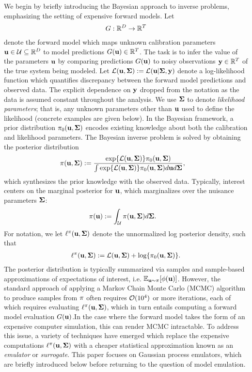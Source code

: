 \documentclass[12pt]{article}
\begin{document}
We begin by briefly introducing the Bayesian approach to inverse problems, emphasizing the setting of expensive forward models. 
Let 
\begin{align*}
G: \mathbb{R}^{D} \to \mathbb{R}^{T}
\end{align*}
denote the forward model which maps unknown calibration parameters $\mathbf{u} \in \mathcal{U} \subseteq \mathbb{R}^{D}$ to model predictions 
$G(\mathbf{u}) \in \mathbb{R}^{T}$. The task is to infer the value of the parameters $\mathbf{u}$ by comparing predictions $G(\mathbf{u})$ to noisy 
observations $\mathbf{y} \in \mathbb{R}^{T}$ of the true system being modeled. Let $\mathcal{L}(\mathbf{u}, \boldsymbol{\Sigma}) := \mathcal{L}(\mathbf{u} |\boldsymbol{\Sigma}, \mathbf{y})$ denote 
a log-likelihood function which quantifies discrepancy between the forward model predictions and observed data. The 
explicit dependence on $\mathbf{y}$ dropped from the notation as the data is assumed constant throughout the analysis. We use $\boldsymbol{\Sigma}$ to denote 
\textit{likelihood parameters}; that is, any unknown parameters other than $\mathbf{u}$ used to define the likelihood (concrete examples are given below). 
In the Bayesian framework, 
a prior distribution $\pi_0(\mathbf{u}, \boldsymbol{\Sigma})$ encodes existing knowledge about both the calibration and likelihood parameters. 
The Bayesian inverse problem is solved by obtaining the 
posterior distribution
\begin{align*}
\pi(\mathbf{u}, \boldsymbol{\Sigma}) &:= \frac{\exp\mathopen{}\left\{\mathcal{L}(\mathbf{u}, \boldsymbol{\Sigma})\right\}\mathclose{}\pi_0(\mathbf{u}, \boldsymbol{\Sigma})}{\int \exp\mathopen{}\left\{\mathcal{L}(\mathbf{u}, \boldsymbol{\Sigma})\right\}\mathclose{}\pi_0(\mathbf{u}, \boldsymbol{\Sigma}) d\mathbf{u} d\boldsymbol{\Sigma}},
\end{align*}
which synthesizes the prior knowledge with the observed data. Typically, interest centers on the marginal posterior for $\mathbf{u}$, which marginalizes over the nuisance 
parameters $\boldsymbol{\Sigma}$:
\begin{align*}
\pi(\mathbf{u}) &:= \int_{\mathcal{U}} \pi(\mathbf{u}, \boldsymbol{\Sigma}) d\boldsymbol{\Sigma}.
\end{align*}
For notation, we let $\ell^{\pi}(\mathbf{u}, \boldsymbol{\Sigma})$ denote the unnormalized log posterior density, such that 
\begin{align*}
\ell^{\pi}(\mathbf{u}, \boldsymbol{\Sigma}) := \mathcal{L}(\mathbf{u}, \boldsymbol{\Sigma}) + \log\mathopen{}\left\{\pi_0(\mathbf{u}, \boldsymbol{\Sigma})\right\}\mathclose{}.
\end{align*}
The posterior distribution is typically summarized via samples and sample-based approximations of expectations of interest, i.e. $\mathbb{E}_{\mathbf{u} \sim \pi}[\phi(\mathbf{u})]$.
However, the standard approach of applying a Markov Chain Monte Carlo (MCMC) algorithm to produce samples from $\pi$ often requires 
$\mathcal{O}(10^4)$ or more iterations, each of which requires evaluating $\ell^{\pi}(\mathbf{u}, \boldsymbol{\Sigma})$, which 
in turn entails computing a forward model evaluation $G(\mathbf{u})$.In the  case where the forward model takes the form of an expensive computer simulation, this 
can render MCMC intractable. To address this issue, a variety of techniques have emerged which replace the expensive computations 
$\ell^{\pi}(\mathbf{u}, \boldsymbol{\Sigma})$ with a cheaper statistical approximation known as an \textit{emulator} or \textit{surrogate}. This paper focuses on Gaussian process 
emulators, which are briefly introduced below before returning to the question of model emulation. 
\end{document}
